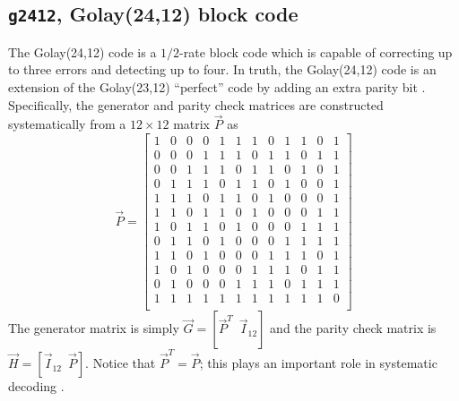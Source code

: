 \subsection{{\tt g2412}, Golay(24,12) block code}
\label{module:fec:golay}
The Golay(24,12) code is a $1/2$-rate block code which is capable of
correcting up to three errors and detecting up to four.
In truth, the Golay(24,12) code is an extension of the Golay(23,12)
``perfect'' code by adding an extra parity bit \cite[\S4.6]{Lin:2004}.
Specifically, the generator and parity check matrices are constructed
systematically from a $12 \times 12$ matrix $\vec{P}$ as
%
\begin{equation}
    \vec{P} = 
    \begin{bmatrix}
        1 & 0 & 0 & 0 & 1 & 1 & 1 & 0 & 1 & 1 & 0 &  1 \\
        0 & 0 & 0 & 1 & 1 & 1 & 0 & 1 & 1 & 0 & 1 &  1 \\
        0 & 0 & 1 & 1 & 1 & 0 & 1 & 1 & 0 & 1 & 0 &  1 \\
        0 & 1 & 1 & 1 & 0 & 1 & 1 & 0 & 1 & 0 & 0 &  1 \\
        1 & 1 & 1 & 0 & 1 & 1 & 0 & 1 & 0 & 0 & 0 &  1 \\
        1 & 1 & 0 & 1 & 1 & 0 & 1 & 0 & 0 & 0 & 1 &  1 \\
        1 & 0 & 1 & 1 & 0 & 1 & 0 & 0 & 0 & 1 & 1 &  1 \\
        0 & 1 & 1 & 0 & 1 & 0 & 0 & 0 & 1 & 1 & 1 &  1 \\
        1 & 1 & 0 & 1 & 0 & 0 & 0 & 1 & 1 & 1 & 0 &  1 \\
        1 & 0 & 1 & 0 & 0 & 0 & 1 & 1 & 1 & 0 & 1 &  1 \\
        0 & 1 & 0 & 0 & 0 & 1 & 1 & 1 & 0 & 1 & 1 &  1 \\
        1 & 1 & 1 & 1 & 1 & 1 & 1 & 1 & 1 & 1 & 1 &  0 \\
    \end{bmatrix}
\end{equation}
%
The generator matrix is simply
$\vec{G} = \left[ \vec{P}^T \,\,\, \vec{I}_{12} \right]$
and the parity check matrix is
$\vec{H} = \left[ \vec{I}_{12} \,\,\, \vec{P} \right]$.
Notice that $\vec{P}^T = \vec{P}$; this plays an important role in
systematic decoding \cite{Berlekamp:1972}.

